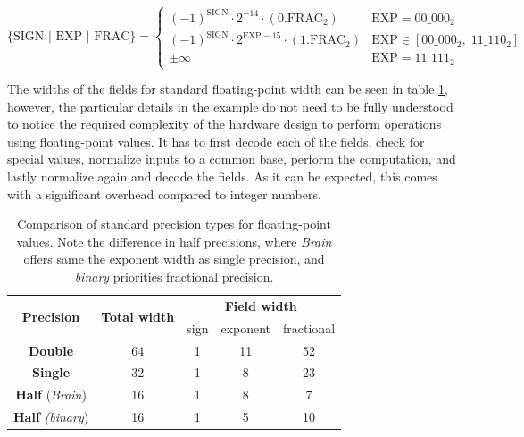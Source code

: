 \begin{equation}\label{eq:floating-point}
  \{\text{SIGN | EXP | FRAC}\} = 
  \begin{cases}
    (-1)^{\text{SIGN}} \cdot 2^{-14} \cdot (0.\text{FRAC}_2) & \text{EXP} = 00\_000_2 \\
    (-1)^{\text{SIGN}} \cdot 2^{\text{EXP}-15} \cdot (1.\text{FRAC}_2) & \text{EXP} \in [00\_000_2,\; 11\_110_2] \\
    \pm \infty & \text{EXP} = 11\_111_2
  \end{cases}
\end{equation}

The widths of the fields for standard floating-point width can be seen in table \ref{tab:floating-point-widths}, however, the particular details in the example do not need to be fully understood to notice the required complexity of the hardware design to perform operations using floating-point values. It has to first decode each of the fields, check for special values, normalize inputs to a common base, perform the computation, and lastly normalize again and decode the fields. As it can be expected, this comes with a significant overhead compared to integer numbers.

\begin{table}[hpt!]
  \centering
  \caption{Comparison of standard precision types for floating-point values. Note the difference in half precisions, where \textit{Brain} offers same the exponent width as single precision, and \textit{binary} priorities fractional precision.}
  \label{tab:floating-point-widths}
  \begin{tabular}{|c|c|ccc|}
  \hline
  \multirow{2}{*}{\textbf{Precision}} & \multirow{2}{*}{\textbf{Total width}} & \multicolumn{3}{c|}{\textbf{Field width}}                                    \\ \cline{3-5} 
                                      &                                       & \multicolumn{1}{c|}{sign} & \multicolumn{1}{c|}{exponent} & fractional \\ \hline
  \textbf{Double}                     & 64                                    & \multicolumn{1}{c|}{1}    & \multicolumn{1}{c|}{11}       & 52         \\ \hline
  \textbf{Single}                     & 32                                    & \multicolumn{1}{c|}{1}    & \multicolumn{1}{c|}{8}        & 23         \\ \hline
  \textbf{Half} (\textit{Brain})               & 16                                    & \multicolumn{1}{c|}{1}    & \multicolumn{1}{c|}{8}        & 7          \\ \hline
  \textbf{Half} \textit{(binary})              & 16                                    & \multicolumn{1}{c|}{1}    & \multicolumn{1}{c|}{5}        & 10         \\ \hline
  \end{tabular}
\end{table}

